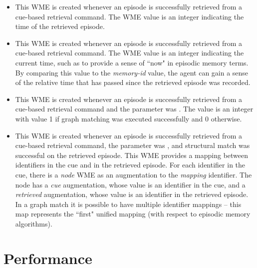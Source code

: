 \begin{itemize}
\item {}

This WME is created whenever an episode is successfully retrieved from a cue-based retrieval command.  
The WME value is an integer indicating the time of the retrieved episode.

\item {}

This WME is created whenever an episode is successfully retrieved from a cue-based retrieval command.  
The WME value is an integer indicating the current time, such as to provide a sense of ``now" in episodic memory terms.  
By comparing this value to the \emph{memory-id} value, the agent can gain a sense of the relative time that has passed since the retrieved episode was recorded.

\item {}

This WME is created whenever an episode is successfully retrieved from a cue-based retrieval command and the  parameter was .  
The value is an integer with value 1 if graph matching was executed successfully and 0 otherwise.

\item {}

This WME is created whenever an episode is successfully retrieved from a cue-based retrieval command, the  parameter was , and structural match was successful on the retrieved episode.  
This WME provides a mapping between identifiers in the cue and in the retrieved episode.  
For each identifier in the cue, there is a \emph{node} WME as an augmentation to the \emph{mapping} identifier.  
The node has a \emph{cue} augmentation, whose value is an identifier in the cue, and a \emph{retrieved} augmentation, whose value is an identifier in the retrieved episode.  
In a graph match it is possible to have multiple identifier mappings -- this map represents the ``first" unified mapping (with respect to episodic memory algorithms).

\end{itemize}

\section{Performance}
\label{EPMEM-perf}

